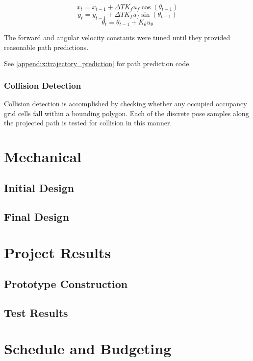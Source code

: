 \documentclass[oneside,final,a4paper]{report}
\begin{document}
\begin{equation}
x_t = x_{t-1} + \Delta T K_f u_f \cos (\theta_{t-1})
\end{equation}
\begin{equation}
y_t = y_{t-1} + \Delta T K_f u_f \sin (\theta_{t-1})
\end{equation}
\begin{equation}
\theta_t = \theta_{t-1} + K_{\theta} u_{\theta}
\end{equation}

The forward and angular velocity constants were tuned until they provided reasonable path predictions.

See \ref{appendix:trajectory_prediction} for path prediction code.

\subsection{Collision Detection}
Collision detection is accomplished by checking whether any occupied occupancy grid cells fall within a bounding polygon.  Each of the discrete pose samples along the projected path is tested for collision in this manner.


\chapter{Mechanical}

\section{Initial Design}

\section{Final Design}


\chapter{Project Results}

\section{Prototype Construction}

\section{Test Results}

\chapter{Schedule and Budgeting}
\end{document}

